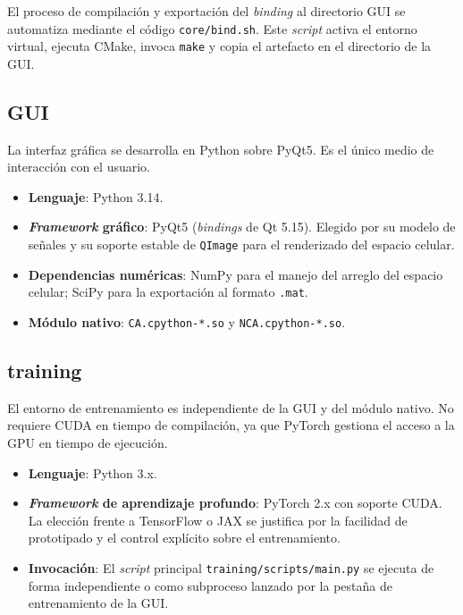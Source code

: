 El proceso de compilación y exportación del \textit{binding} al directorio GUI se automatiza mediante el código \texttt{core/bind.sh}. Este \textit{script} activa el entorno virtual, ejecuta CMake, invoca \texttt{make} y copia el artefacto en el directorio de la GUI.

\subsection{GUI}

La interfaz gráfica se desarrolla en Python sobre PyQt5. Es el único medio de interacción con el usuario. 

\begin{itemize}
    \item \textbf{Lenguaje}: Python 3.14.
    \item \textbf{\textit{Framework} gráfico}: PyQt5 (\textit{bindings} de Qt 5.15). Elegido por su modelo de señales y su soporte estable de \texttt{QImage} para el renderizado del espacio celular.
    \item \textbf{Dependencias numéricas}: NumPy para el manejo del arreglo del espacio celular; SciPy para la exportación al formato \texttt{.mat}.
    \item \textbf{Módulo nativo}: \texttt{CA.cpython-*.so} y \texttt{NCA.cpython-*.so}.
\end{itemize}

\subsection{training}

El entorno de entrenamiento es independiente de la GUI y del módulo nativo. No requiere CUDA en tiempo de compilación, ya que PyTorch gestiona el acceso a la GPU en tiempo de ejecución.

\begin{itemize}
    \item \textbf{Lenguaje}: Python 3.x.
    \item \textbf{\textit{Framework} de aprendizaje profundo}: PyTorch 2.x con soporte CUDA. La elección frente a TensorFlow o JAX se justifica por la facilidad de prototipado y el control explícito sobre el entrenamiento.
    \item \textbf{Invocación}: El \textit{script} principal \texttt{training/scripts/main.py} se ejecuta de forma independiente o como subproceso lanzado por la pestaña de entrenamiento de la GUI.
\end{itemize}